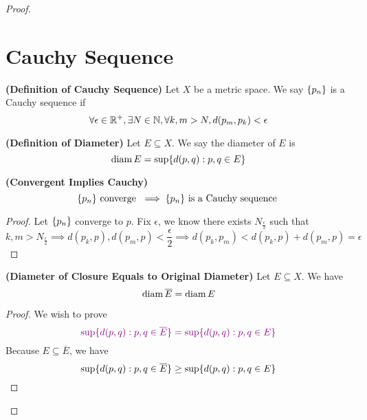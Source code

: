 \documentclass{report}
\begin{document}
\begin{proof}
\section{Cauchy Sequence}
\begin{definition}
\label{1.13.1}
\textbf{(Definition of Cauchy Sequence)} Let $X$ be a metric space. We say $\{ p_n \}$ is a Cauchy sequence if 
\begin{equation}
\forall \epsilon\in\mathbb{R}^+,\exists N\in\mathbb{N}, \forall k,m>N, d(p_m,p_k)<\epsilon 
\end{equation}
\end{definition}
\begin{definition}
\label{1.13.2}
\textbf{(Definition of Diameter)} Let $E\subseteq X$. We say the diameter of $E$ is
 \begin{equation}
\text{diam}\, E=\sup \{ d(p,q):p,q\in E \}
\end{equation}
\end{definition}
\begin{theorem}
\label{1.13.3}
\textbf{(Convergent Implies Cauchy)} 
\begin{equation}
\{ p_n \}\text{ converge }\implies \{ p_n \}\text{ is a Cauchy sequence }
\end{equation}
\end{theorem}
\begin{proof}
Let $\{ p_n \}$ converge to $p$. Fix $\epsilon $, we know there exists $N_{\frac{\epsilon }{2}}$ such that
\begin{equation}
k,m>N_{\frac{\epsilon}{2}}\implies d(p_k,p),d(p_m,p)<\frac{\epsilon}{2}\implies d(p_k,p_m)<d(p_k,p)+d(p_m,p)=\epsilon 
\end{equation}
\end{proof}
\begin{theorem}
\label{1.13.4}
\textbf{(Diameter of Closure Equals to Original Diameter)} Let $E\subseteq X$. We have
\begin{equation}
\text{diam}\, \overline{E}=\text{diam}\, E
\end{equation}
\end{theorem}
\begin{proof}
We wish to prove
\begin{equation}
  \textcolor{violet}{\sup \{ d(p,q):p,q\in \overline{E} \}=\sup \{ d(p,q):p,q\in E \}}
\end{equation}
Because $E\subseteq \overline{E}$, we have
\begin{equation}
\sup \{ d(p,q):p,q\in \overline{E} \}\geq \sup \{ d(p,q):p,q\in E \}
\end{equation}

\end{proof}
\end{proof}
\end{document}
